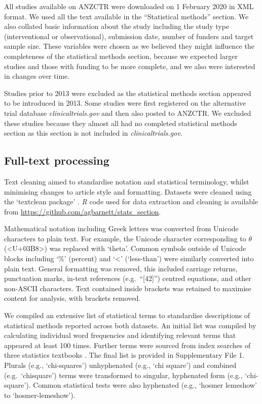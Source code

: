\documentclass[12pt]{article}
\begin{document}
All studies available on ANZCTR were downloaded on 1 February 2020 in
XML format. We used all the text available in the ``Statistical
methods'' section. We also collated basic information about the study
including the study type (interventional or observational), submission
date, number of funders and target sample size. These variables were
chosen as we believed they might influence the completeness of the
statistical methods section, because we expected larger studies and
those with funding to be more complete, and we also were interested in
changes over time.

Studies prior to 2013 were excluded as the statistical methods section
appeared to be introduced in 2013. Some studies were first registered on
the alternative trial database \emph{clinicaltrials.gov} and then also
posted to ANZCTR. We excluded these studies because they almost all had
no completed statistical methods section as this section is not included
in \emph{clinicaltrials.gov}.

\subsection{Full-text processing}
\label{sec:methods-cleaning}

 Text cleaning aimed to standardise notation and
statistical terminology, whilst minimising changes to article style and
formatting. Datasets were cleaned using the `textclean package'
\citep{textclean}. \emph{R} code used for data extraction and cleaning is
available from \url{https://github.com/agbarnett/stats_section}.

Mathematical notation including Greek letters was converted from Unicode
characters to plain text. For example, the Unicode character
corresponding to \(\theta\) (\textless U+03B8\textgreater) was replaced
with `theta'. Common symbols outside of Unicode blocks including `\%'
(percent) and `\textless{}' (`less-than') were similarly converted into
plain text. General formatting was removed, this included carriage
returns, punctuation marks, in-text references (e.g.~``{[}42{]}'')
centred equations, and other non-ASCII characters. Text contained inside
brackets was retained to maximise content for analysis, with brackets
removed.

We compiled an extensive list of statistical terms to standardise
descriptions of statistical methods reported across both datasets. An
initial list was compiled by calculating individual word frequencies and
identifying relevant terms that appeared at least 100 times. Further
terms were sourced from index searches of three statistics textbooks
\citep{Diggle2013,Bland2015,Dobson2018}. The final list
is provided in Supplementary File 1. Plurals (e.g., `chi-squares')
unhyphenated (e.g., `chi square') and combined (e.g.~`chisquare') terms
were transformed to singular, hyphenated form (e.g., `chi-square').
Common statistical tests were also hyphenated (e.g., `hosmer lemeshow'
to `hosmer-lemeshow').
\end{document}
